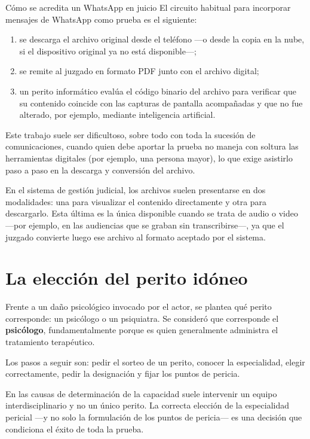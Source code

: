 \documentclass[12pt,oneside]{book}
\begin{document}
\begin{example}{Cómo se acredita un WhatsApp en juicio}
El circuito habitual para incorporar mensajes de WhatsApp como prueba es el siguiente:
\begin{enumerate}
    \item se descarga el archivo original desde el teléfono ---o desde la copia en la nube, si el dispositivo original ya no está disponible---;
    \item se remite al juzgado en formato PDF junto con el archivo digital;
    \item un perito informático evalúa el código binario del archivo para verificar que su contenido coincide con las capturas de pantalla acompañadas y que no fue alterado, por ejemplo, mediante inteligencia artificial.
\end{enumerate}
Este trabajo suele ser dificultoso, sobre todo con toda la sucesión de comunicaciones, cuando quien debe aportar la prueba no maneja con soltura las herramientas digitales (por ejemplo, una persona mayor), lo que exige asistirlo paso a paso en la descarga y conversión del archivo.
\end{example}

En el sistema de gestión judicial, los archivos suelen presentarse en dos modalidades: una para visualizar el contenido directamente y otra para descargarlo. Esta última es la única disponible cuando se trata de audio o video ---por ejemplo, en las audiencias que se graban sin transcribirse---, ya que el juzgado convierte luego ese archivo al formato aceptado por el sistema.

\section{La elección del perito idóneo}

Frente a un daño psicológico invocado por el actor, se plantea qué perito corresponde: un psicólogo o un psiquiatra. Se consideró que corresponde el \textbf{psicólogo}, fundamentalmente porque es quien generalmente administra el tratamiento terapéutico.

Los pasos a seguir son: pedir el sorteo de un perito, conocer la especialidad, elegir correctamente, pedir la designación y fijar los puntos de pericia.

En las causas de determinación de la capacidad suele intervenir un equipo interdisciplinario y no un único perito. La correcta elección de la especialidad pericial ---y no solo la formulación de los puntos de pericia--- es una decisión que condiciona el éxito de toda la prueba.
\end{document}

